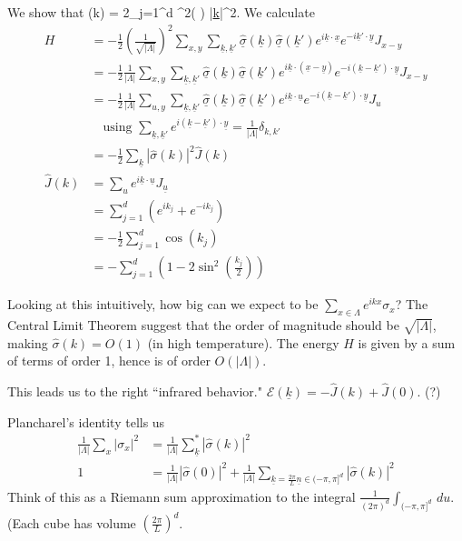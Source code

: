 \documentclass[12pt]{book}
\theoremstyle{norm}
\begin{document}
We show that
\be
\widehat{\underline{\sigma}}(k) = 2\sum_{j=1}^{d} \sin^2\left( {} \right) \approx {} |\underline{k}|^2.
\ee
We calculate
\begin{align}
H &= -\frac{1}{2}\left( {\frac{1}{\sqrt{|\Lambda|}}} \right)^2\sum_{x,y} \sum_{\underline{k}, \underline{k}'} \widehat{\underline{\sigma}}(\underline{k})\widehat{\underline{\sigma}}(\underline{k}') e^{i\underline{k}\cdot \underline{x}} e^{-i\underline{k}'\cdot \underline{y}}J_{x-y}\\
&=-\frac{1}{2}\frac{1}{|\Lambda|}  
\sum_{x,y} \sum_{\underline{k}, \underline{k}'} \widehat{\underline{\sigma}}(\underline{k})\widehat{\underline{\sigma}}(\underline{k}') e^{i\underline{k}\cdot (\underline{x}-\underline{y})} e^{-i(\underline{k}-\underline{k}')\cdot \underline{y}}J_{x-y}\\
&=-\frac{1}{2}\frac{1}{|\Lambda|} \sum_{u,y} \sum_{\underline{k}, \underline{k}'} \widehat{\underline{\sigma}}(\underline{k})\widehat{\underline{\sigma}}(\underline{k}') e^{i\underline{k}\cdot \underline{u}} e^{-i(\underline{k}-\underline{k}')\cdot \underline{y}}J_{u}\\
&\quad \text{using }\sum_{\underline{k},\underline{k}'} e^{i(\underline{k}-\underline{k}')\cdot\underline{y}} = \frac{1}{|\Lambda|} \delta_{k,k'}\\
&=-\frac{1}{2}\sum_{\underline{k}} |\widehat{\sigma}(k)|^2 \widehat{J}(k)\\
\widehat{J}(k) &= \sum_u e^{i\underline{k}\cdot \underline{u}} J_{\underline{u}} \\
&=\sum_{j=1}^{d} (e^{ik_j}+e^{-ik_j})\\
&=%
-\frac{1}{2} \sum_{j=1}^{d} \cos(k_j)\\
&= -\sum_{j=1}^{d} \left( {1-2\sin^2\left( {\frac{k_j}{2}} \right)} \right)
\end{align}

Looking at this intuitively, %
how big can we expect to be $\sum_{x\in \Lambda} e^{ikx}\sigma_x$? The Central Limit Theorem suggest that the order of magnitude should be $\sqrt{|\Lambda|}$, making $\widehat{\sigma}(k)=O(1)$ (in high temperature). The energy $H$ is given by a sum of terms of order 1, hence is of order $O(|\Lambda|)$. 

This leads us to the right ``infrared behavior." $\mathcal{E}(\underline{k}) = -\widehat{J}(k) + \widehat{J}(0)$. (?)

Plancharel's identity tells us
\begin{align}
\frac{1}{|\Lambda|}\sum_x |\sigma_x|^2 &= 
\frac{1}{|\Lambda|}\sum_{\underline{k}}^* |\widehat{\sigma}(k)|^2\\
1 &= \frac{1}{|\Lambda|}|\widehat{\sigma}(0)|^2 + \frac{1}{|\Lambda|} \sum_{\underline{k} = \frac{2\pi}{L} \underline{n}\in (-\pi, \pi]^d}|\widehat{\sigma}(k)|^2
\end{align}
Think of this as a Riemann sum approximation to the integral $\frac{1}{(2\pi)^d}\int_{(-\pi,\pi]^d}\,du$. (Each cube has volume $\left( {\frac{2\pi}{L}} \right)^d$.
\end{document}
